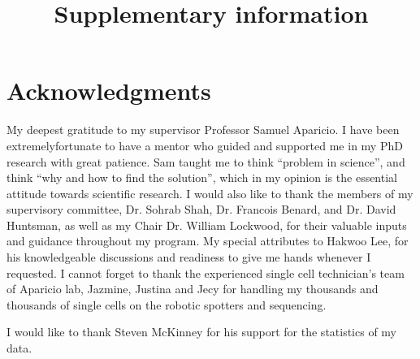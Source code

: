

\makeatletter
\newcommand{\putFigLargCap}[5]
{
\begin{center}
\texttt{[image: \#1]}   
\bigskip
\setbox0\vbox{
\let\caption@rule\relax
\captionof{figure}[#5]{\textbf{#5} #3 \label{#4}}
\global\skip1\lastskip\unskip
\global\setbox1\lastbox

}
\unvbox0
\setbox0\hbox{\unhbox1\unskip\unskip\unpenalty
\global\setbox1\lastbox}
\unvbox1
\vskip\skip1
\end{center}
}
\makeatother





\title{Supplementary information}















\chapter{Acknowledgments}

My deepest gratitude to my supervisor Professor Samuel Aparicio. I have been extremelyfortunate to have a mentor who guided and supported me in my PhD research with great patience. Sam taught me to think “problem in science”, and think “why and how to find the solution”, which in my opinion is the essential attitude towards scientific research. I would also like to thank the members of my supervisory committee, Dr. Sohrab Shah, Dr. Francois Benard, and Dr. David Huntsman, as well as my Chair Dr. William Lockwood, for their valuable inputs and guidance throughout my program. My special attributes to Hakwoo Lee, for his knowledgeable discussions and  readiness to give me hands whenever I requested. I cannot forget to thank the experienced single cell technician's team of Aparicio lab, Jazmine, Justina and Jecy for handling my thousands and thousands of single cells on the robotic spotters and sequencing. 

I would like to thank Steven McKinney for his support for the statistics of my data. 
